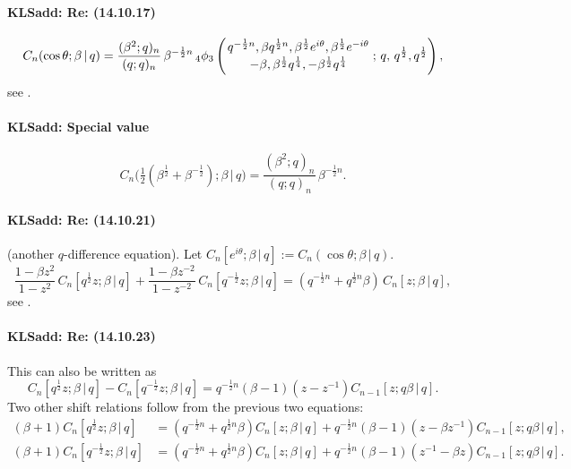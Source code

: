 \documentclass[envcountchap,graybox]{svmono}
\newcounter{rom}
\newcommand{\qhyp}[5]{\mbox{}_{#1}{\phi}_{#2}
\left(\genfrac{}{}{0pt}{}{#3}{#4}\,;\,q,\,#5\right)}
\newcommand\be\beta
\newcommand\tha\theta
\newcommand\half{\frac12}
\newcommand\thalf{\tfrac12}
\newcommand{\qhyp}[5]{\,\mbox{}_{#1}\phi_{#2}\!\left(
  \genfrac{}{}{0pt}{}{#3}{#4};#5\right)}
\begin{document}
\paragraph{\large\bf KLSadd: Re: (14.10.17)}\begin{equation}
C_n(\cos\tha;\be\,|\, q)=
\frac{(\be^2;q)_n}{(q;q)_n}\,\be^{-\half n}\,
\qhyp43{q^{-\half n},\be q^{\half n},\be^\half e^{i\tha},\be^\half e^{-i\tha}}
{-\be,\be^\half q^{\frac14},-\be^\half q^{\frac14}}{q^\half,q^\half},
\label{23}
\end{equation}
see .
%
\paragraph{\large\bf KLSadd: Special value}\begin{equation}
C_n\big(\thalf(\be^\half+\be^{-\half});\be\,|\, q\big)
=\frac{(\be^2;q)_n}{(q;q)_n}\,\be^{-\half n}.
\end{equation}
%
\paragraph{\large\bf KLSadd: Re: (14.10.21)}(another $q$-difference equation).
Let $C_n[e^{i\tha};\be\,|\, q]:=C_n(\cos\tha;\be\,|\, q)$.
\begin{equation}
\frac{1-\be z^2}{1-z^2}\,C_n[q^\half z;\be\,|\, q]+
\frac{1-\be z^{-2}}{1-z^{-2}}\,C_n[q^{-\half}z;\be\,|\, q]=
(q^{-\half n}+q^{\half n} \be)\,C_n[z;\be\,|\, q],
\label{24}
\end{equation}
see .
%
\paragraph{\large\bf KLSadd: Re: (14.10.23)}This can also be written as
\begin{equation}
C_n[q^\half z;\be\,|\, q]-C_n[q^{-\half}z;\be\,|\, q]=
q^{-\half n}(\be-1)(z-z^{-1})C_{n-1}[z;q\be\,|\, q].
\label{25}
\end{equation}
Two other shift relations follow from the previous two equations:
\begin{align}
(\be+1)C_n[q^\half z;\be\,|\, q]&=(q^{-\half n}+q^{\half n}\be)C_n[z;\be\,|\, q]
+q^{-\half n}(\be-1)(z-\be z^{-1})C_{n-1}[z;q\be\,|\, q],
\label{26}\\
(\be+1)C_n[q^{-\half}z;\be\,|\, q]&=(q^{-\half n}+q^{\half n}\be)C_n[z;\be\,|\, q]
+q^{-\half n}(\be-1)(z^{-1}-\be z)C_{n-1}[z;q\be\,|\, q].
\label{27}
\end{align}
%
\end{document}
